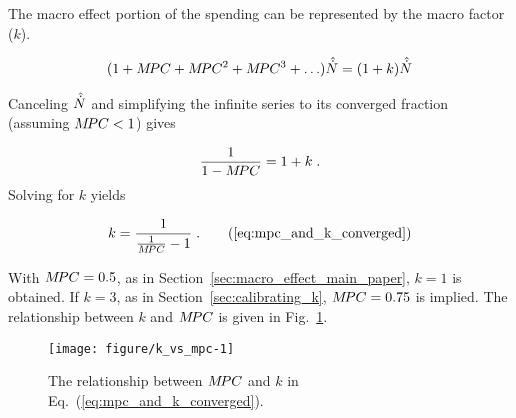 \documentclass[12pt]{article}\usepackage[]{graphicx}\usepackage[]{xcolor}
\makeatletter
\def\maxwidth{ %
  \ifdim\Gin@nat@width>\linewidth
    \linewidth
  \else
    \Gin@nat@width
  \fi
}
\newenvironment{knitrout}{}{} %
\makeatother
\begin{document}
The macro effect portion of the spending can be represented by the macro factor ($k$).

\begin{equation} \label{eq:mpc_and_k}
  (1 + M\!PC + M\!PC^2 + M\!PC^3 + \ldots) \hat{\dot{N}} = (1 + k) \hat{\dot{N}}
\end{equation}

Canceling $\hat{\dot{N}}$ and simplifying the infinite series to its converged fraction
(assuming $M\!PC < 1$) gives

\begin{equation}
  \frac{1}{1 - M\!PC} = 1 + k \; .
\end{equation}
%
Solving for $k$ yields

\begin{equation}
  k = \frac{1}{\frac{1}{\MPC} - 1} \; .  \tag{\ref{eq:mpc_and_k_converged}}
\end{equation}

With $M\!PC = 0.5$, as in Section~\ref{sec:macro_effect_main_paper}, 
$k = 1$ is obtained.
If $k = 3$, as in Section~\ref{sec:calibrating_k}, 
$M\!PC = 0.75$ is implied.
The relationship between $k$ and $M\!PC$ is given in Fig.~\ref{fig:k_vs_mpc}.

\begin{knitrout}
\color{fgcolor}\begin{figure}
\texttt{[image: figure/k\_vs\_mpc-1]} \caption{The relationship between $M\!PC$ and $k$ in Eq.~(\ref{eq:mpc_and_k_converged}).}\label{fig:k_vs_mpc}
\end{figure}

\end{knitrout}
\end{document}
